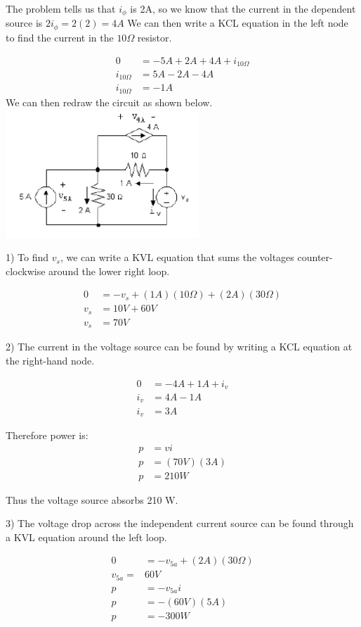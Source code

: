 The problem tells us that $i_{\phi}$ is 2A, so we know that the current in the dependent source is $2i_{\phi} = 2(2) = 4A$ We can then write a KCL equation in the left node to find the current in the 
$10\Omega$ resistor.

\begin{align*}
	0 &= -5A + 2A +4A + i_{10\Omega} \\
	i_{10\Omega} &= 5A - 2A - 4A \\
	i_{10\Omega} &= -1 A
\end{align*}
We can then redraw the circuit as shown below. 
\includegraphics[scale=0.25]{img/c2/a4}

1) To find $v_s$, we can write a KVL equation that sums the voltages counter-clockwise around the 
lower right loop. 

\begin{align*}
	0 &= -v_s + (1A)(10 \Omega) + (2A)(30 \Omega) \\
	v_s &= 10V + 60V \\
	v_s &= 70 V
\end{align*}

2) The current in the voltage source can be found by writing a KCL equation at the right-hand node. 

\begin{align*}
	0 &= -4 A + 1 A + i_v \\
	i_v &= 4A - 1A \\
	i_v &= 3A 
\end{align*}

Therefore power is:
\begin{align*}
	p &= vi \\
	p &= (70 V)(3 A) \\
	p &= 210 W
\end{align*}

Thus the voltage source absorbs 210 W. 

3) The voltage drop across the independent current source can be found through a KVL equation around 
the left loop. 

\begin{align*}
	0 &= -v_{5a} + (2A)(30\Omega) \\
	v_{5a}	= &60 V \\
	p &= -v_{5a}i \\
	p &= -(60V)(5A) \\
	p &= -300 W \\
\end{align*}

